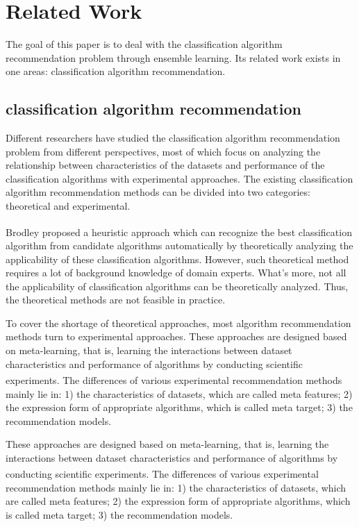 \documentclass[review,3p,twocolumn,times]{elsarticle}
\newcommand{\upcite}[1]{\textsuperscript{\cite{#1}}}
\begin{document}
\section{Related Work}\label{Related Work}

The goal of this paper is to deal with the classification algorithm recommendation problem through ensemble learning. Its related work exists in one areas: classification algorithm recommendation.


\subsection{classification algorithm recommendation}

Different researchers have studied the classification algorithm recommendation problem from different perspectives, most of which focus on analyzing the relationship between characteristics of the datasets and performance of the classification algorithms with experimental approaches. The existing classification algorithm recommendation methods can be divided into two categories: theoretical and experimental.

Brodley\upcite{Brodley1993Addressing} proposed a heuristic approach which can recognize the best classification algorithm from candidate algorithms automatically by theoretically analyzing the applicability of these classification algorithms. However, such theoretical method requires a lot of background knowledge of domain experts. What's more, not all the applicability of classification algorithms can be theoretically analyzed. Thus, the theoretical methods are not feasible in practice.

To cover the shortage of theoretical approaches, most algorithm recommendation methods turn to experimental approaches. These approaches are designed based on meta-learning, that is, learning the interactions between dataset characteristics and performance of algorithms by conducting scientific experiments\upcite{Ali2006On,Aha1992Generalizing,Brazdil1994Characterizing,Kalousis2004On,Brazdil2003Ranking,Balte2014Meta}. The differences of various experimental recommendation methods mainly lie in: 1) the characteristics of datasets, which are called meta features; 2) the expression form of appropriate algorithms, which is called meta target; 3) the recommendation models.

These approaches are designed based on meta-learning, that is, learning the interactions between dataset characteristics and performance of algorithms by conducting scientific experiments\upcite{Aha1992Generalizing,Brazdil1994Characterizing,Kalousis2004On,Brazdil2003Ranking,Balte2014Meta}. The differences of various experimental recommendation methods mainly lie in: 1) the characteristics of datasets, which are called meta features; 2) the expression form of appropriate algorithms, which is called meta target; 3) the recommendation models.
\end{document}
